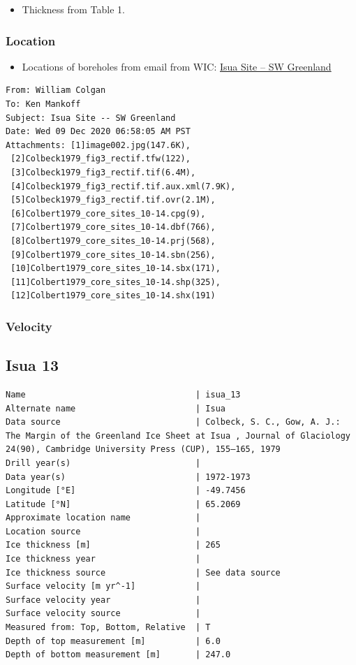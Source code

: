 \documentclass[article,a4paper,times,11pt,twoside]{article}
\begin{document}
\begin{itemize}
\item Thickness from \textcite{colbeck_1979} Table 1.
\end{itemize}

\subsubsection{Location}
\label{sec:org353e076}

\begin{itemize}
\item Locations of boreholes from email from WIC: \href{msgid:AM0PR04MB6129F131ECD9123E72752945A2CC0@AM0PR04MB6129.eurprd04.prod.outlook.com}{Isua Site -- SW Greenland}
\end{itemize}

\begin{verbatim}
From: William Colgan
To: Ken Mankoff
Subject: Isua Site -- SW Greenland
Date: Wed 09 Dec 2020 06:58:05 AM PST
Attachments: [1]image002.jpg(147.6K),
 [2]Colbeck1979_fig3_rectif.tfw(122),
 [3]Colbeck1979_fig3_rectif.tif(6.4M),
 [4]Colbeck1979_fig3_rectif.tif.aux.xml(7.9K),
 [5]Colbeck1979_fig3_rectif.tif.ovr(2.1M),
 [6]Colbert1979_core_sites_10-14.cpg(9),
 [7]Colbert1979_core_sites_10-14.dbf(766),
 [8]Colbert1979_core_sites_10-14.prj(568),
 [9]Colbert1979_core_sites_10-14.sbn(256),
 [10]Colbert1979_core_sites_10-14.sbx(171),
 [11]Colbert1979_core_sites_10-14.shp(325),
 [12]Colbert1979_core_sites_10-14.shx(191)
\end{verbatim}

\subsubsection{Velocity}
\label{sec:org2ac465a}
\clearpage
\subsection{Isua 13}
\label{sec:orgc561d06}
\begin{verbatim}
Name                                  | isua_13
Alternate name                        | Isua
Data source                           | Colbeck, S. C., Gow, A. J.: The Margin of the Greenland Ice Sheet at Isua , Journal of Glaciology 24(90), Cambridge University Press (CUP), 155–165, 1979 
Drill year(s)                         | 
Data year(s)                          | 1972-1973
Longitude [°E]                        | -49.7456
Latitude [°N]                         | 65.2069
Approximate location name             | 
Location source                       | 
Ice thickness [m]                     | 265
Ice thickness year                    | 
Ice thickness source                  | See data source
Surface velocity [m yr^-1]            | 
Surface velocity year                 | 
Surface velocity source               | 
Measured from: Top, Bottom, Relative  | T
Depth of top measurement [m]          | 6.0
Depth of bottom measurement [m]       | 247.0
\end{verbatim}
\end{document}
